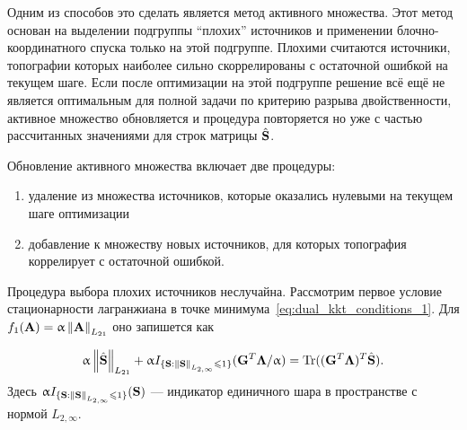 Одним из способов это сделать является метод активного множества.
Этот метод основан на выделении подгруппы ``плохих'' источников
и применении блочно-координатного спуска только на этой подгруппе.
Плохими считаются источники, топографии которых наиболее сильно скоррелированы
с остаточной ошибкой на текущем шаге. Если после оптимизации на этой подгруппе
решение всё ещё не является оптимальным для полной задачи по критерию разрыва двойственности,
активное множество обновляется и процедура повторяется но уже с частью рассчитанных значениями для
строк матрицы $\hat{\mathbf{S}}$.

Обновление активного множества включает две процедуры:
\begin{enumerate}
    \item удаление из множества источников, которые оказались нулевыми на текущем шаге оптимизации
    \item добавление к множеству новых источников, для которых топография коррелирует с остаточной ошибкой.
\end{enumerate}

Процедура выбора плохих источников неслучайна.
Рассмотрим первое условие стационарности лагранжиана в точке минимума~\ref{eq:dual_kkt_conditions_1}.
Для $f_1(\mathbf{A}) = \upalpha\left\lVert\mathbf{A}\right\rVert_{L_{21}}$ оно запишется как

\begin{equation}
    \upalpha \left\lVert\hat{\mathbf{S}}\right\rVert_{L_{21}} + \upalpha I_{\{\mathbf{S} : \left\lVert\mathbf{S}\right\rVert_{L_{2,\infty}} \leqslant 1\}}(\mathbf{G}^T\mathbf{\Lambda}/\upalpha) =
    \operatorname*{Tr}((\mathbf{G}^T\mathbf{\Lambda})^T\hat{\mathbf{S}}).
    \label{eq:dual_kkt_conditions_1_concrete}
\end{equation}
Здесь $\upalpha I_{\{\mathbf{S} : \left\lVert\mathbf{S}\right\rVert_{L_{2,\infty}} \leqslant 1\}}(\mathbf{S})$ --- индикатор единичного шара в пространстве
с нормой $L_{2,\infty}$.

